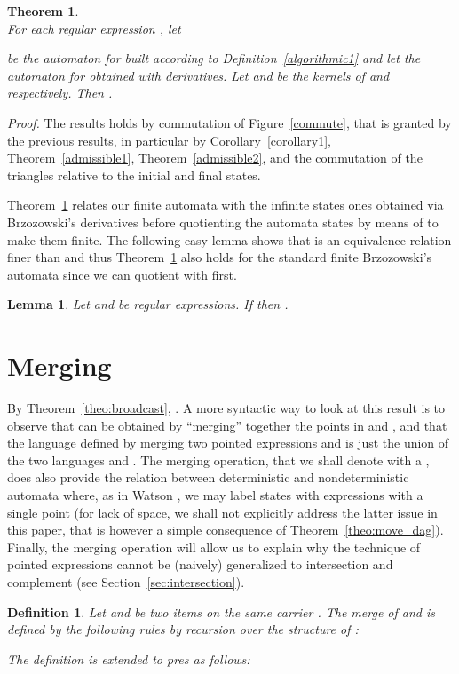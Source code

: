 \documentclass[preprint]{sigplanconf}
\newcounter{item}
\newtheorem{theorem}[item]{Theorem}
\newtheorem{lemma}[item]{Lemma}
\newtheorem{definition}[item]{Definition}
\newenvironment{proof}{\begin{trivlist}\item[]{\em Proof.}}{\end{trivlist}}
\begin{document}
\begin{theorem}\label{thesame}~\\
For each regular expression , let

be the automaton
for  built according to Definition~\ref{algorithmic1} and let
 the automaton for
 obtained with derivatives. Let  and  be the kernels of 
and  respectively. Then
.
\end{theorem}
\begin{proof}
The results holds by commutation of Figure~\ref{commute}, that is granted
by the previous results, in particular by Corollary~\ref{corollary1},
Theorem~\ref{admissible1}, Theorem~\ref{admissible2}, and the commutation
of the triangles relative to the initial and final states.
\end{proof}

Theorem~\ref{thesame} relates our finite automata with the infinite states ones
obtained via Brzozowski's derivatives before quotienting the automata states
by means of  to make them finite. The following easy lemma shows that
 is an equivalence relation finer than  and thus
Theorem~\ref{thesame} also holds for the standard finite Brzozowski's automata
since we can quotient with  first.
\begin{lemma}
Let  and  be regular expressions.
If  then .
\end{lemma}

\section{Merging}\label{merging}
By Theorem~\ref{theo:broadcast}, .
A more syntactic way to look at this result is to observe that 
 can be obtained by ``merging'' together the points in  and 
, and that the language defined by merging two pointed
expressions  and  is just the union of the two languages 
 and . The merging operation, that we shall denote
with a , does also provide the relation between deterministic 
and nondeterministic automata where, as in Watson \cite{Watson01, Watson02}, 
we may label states with expressions with a single point (for lack of space,
we shall not explicitly address the latter issue in this paper, that 
is however a simple consequence of Theorem~\ref{theo:move_dag}).
Finally, the merging operation will allow us to explain why the
technique of pointed expressions cannot be (naively) generalized 
to intersection and complement (see Section~\ref{sec:intersection}).



\begin{definition}
Let  and  be two items on the same carrier . The merge of 
and  is defined by the following rules by recursion over the structure of
:

The definition is extended to pres as follows:

\end{definition}
\end{document}
